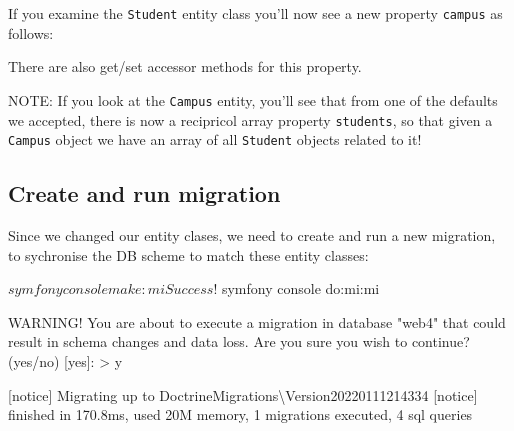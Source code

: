 \documentclass[a4paperpaper,openright]{book}
\newenvironment{Shaded}{}{}
\newcommand{\CommentTok}[1]{\textcolor[rgb]{0.38,0.63,0.69}{\textit{#1}}}
\newcommand{\ExtensionTok}[1]{#1}
\newcommand{\KeywordTok}[1]{\textcolor[rgb]{0.00,0.44,0.13}{\textbf{#1}}}
\newcommand{\NormalTok}[1]{#1}
\newcommand{\OperatorTok}[1]{\textcolor[rgb]{0.40,0.40,0.40}{#1}}
\newcommand{\OtherTok}[1]{\textcolor[rgb]{0.00,0.44,0.13}{#1}}
\newcommand{\StringTok}[1]{\textcolor[rgb]{0.25,0.44,0.63}{#1}}
\begin{document}
If you examine the \texttt{Student} entity class you'll now see a new
property \texttt{campus} as follows:

\begin{Shaded}
\end{Shaded}

There are also get/set accessor methods for this property.

NOTE: If you look at the \texttt{Campus} entity, you'll see that from
one of the defaults we accepted, there is now a recipricol array
property \texttt{students}, so that given a \texttt{Campus} object we
have an array of all \texttt{Student} objects related to it!

\hypertarget{create-and-run-migration}{%
\subsection{Create and run migration}\label{create-and-run-migration}}

Since we changed our entity clases, we need to create and run a new
migration, to sychronise the DB scheme to match these entity classes:

\begin{Shaded}
\begin{Highlighting}[]
\NormalTok{    $ }\ExtensionTok{symfony}\NormalTok{ console make:mi}
               
      \ExtensionTok{Success}\NormalTok{! }

\NormalTok{    $ }\ExtensionTok{symfony}\NormalTok{ console do:mi:mi}
        
         \ExtensionTok{WARNING}\NormalTok{! You are about to execute a migration in database }\StringTok{"web4"}\NormalTok{ that could result in schema changes and data loss. Are you sure you wish to continue? (yes/no) [}\ExtensionTok{yes}\NormalTok{]:}
         \OperatorTok{>} \ExtensionTok{y}
        
\NormalTok{        [}\ExtensionTok{notice}\NormalTok{] Migrating up to DoctrineMigrations\textbackslash{}Version20220111214334}
\NormalTok{        [}\ExtensionTok{notice}\NormalTok{] finished in 170.8ms, used 20M memory, 1 migrations executed, 4 sql queries}
\end{Highlighting}
\end{Shaded}
\end{document}

